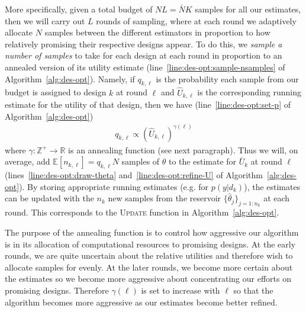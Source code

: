 More specifically, given a total budget of $NL=\bar{N}K$ samples for all our estimates,
then we will carry out $L$ rounds of sampling, where at each round we adaptively allocate $N$ samples
between the different estimators in proportion to how relatively promising their respective designs
appear.  To do this,
we \emph{sample a number of samples} to take for each design at each round in proportion to an annealed version of
its utility estimate (line~\ref{line:des-opt:sample-nsamples} of Algorithm~\ref{alg:des-opt}).  
Namely, if $q_{k,\ell}$ is the probability each sample from our budget is assigned
to design $k$ at round $\ell$ and $\hat{U}_{k,\ell}$ is the corresponding running estimate for the utility
of that design, then we have (line~\ref{line:des-opt:set-p} of Algorithm~\ref{alg:des-opt})
\begin{align}
\label{eq:p_k}
q_{k,\ell} \propto (\hat{U}_{k,\ell})^{\gamma(\ell)}
\end{align}
where $\gamma : \mathbb{Z}^+ \rightarrow \mathbb{R}$ is an annealing function (see next paragraph).  
Thus we will, on average,
add $\mathbb{E}[n_{k,\ell}] = q_{k,\ell}N$ samples of $\theta$ to the estimate for $\bar{U}_k$ at round $\ell$
(lines~\ref{line:des-opt:draw-theta} and~\ref{line:des-opt:refine-U} of Algorithm~\ref{alg:des-opt}).
By storing appropriate running estimates (e.g. for $p(y | d_k)$), the estimates can 
be updated with the $n_k$ new samples from the reservoir
$\{\hat{\theta}_j\}_{j=1:n_k}$ at each round.  This corresponds to the \textsc{Update} function in
Algorithm~\ref{alg:des-opt}.

The purpose of the annealing function is to control how aggressive our algorithm is in its allocation of
computational resources to promising designs.
At the early rounds, we are quite uncertain about the relative
utilities and therefore wish to allocate samples for evenly.  At the later rounds, we become more certain
about the estimates so we become more aggressive about concentrating our efforts on promising designs.
Therefore $\gamma(\ell)$ is set to increase with $\ell$ so that the algorithm becomes more aggressive
as our estimates become better refined.

